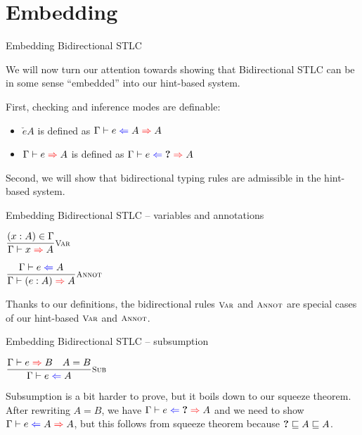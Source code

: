 \documentclass{beamer}
\begin{document}
\section{Embedding}

\begin{frame}{Embedding Bidirectional STLC}

We will now turn our attention towards showing that Bidirectional STLC can be in some sense ``embedded'' into our hint-based system.

\vspace{2em}

First, checking and inference modes are definable:

\begin{itemize}
  \item $\check{e}{A}$ is defined as $\hinting{e}{A}{A}$
  \item $\infer{e}{A}$ is defined as $\hinting{e}{\Hole}{A}$
\end{itemize}

\vspace{2em}

Second, we will show that bidirectional typing rules are admissible in the hint-based system.

\end{frame}

\begin{frame}{Embedding Bidirectional STLC -- variables and annotations}

\begin{center}
  $\infrule[Var]{\sidecond{(x : A) \in \Gamma}}{\infer{x}{A}}$

  \vspace{2em}

  $\infrule[Annot]{\check{e}{A}}{\infer{\annot{e}{A}}{A}}$
\end{center}

\vspace{2em}

Thanks to our definitions, the bidirectional rules $\textsc{\footnotesize{Var}}$ and $\textsc{\footnotesize{Annot}}$ are special cases of our hint-based $\textsc{\footnotesize{Var}}$ and $\textsc{\footnotesize{Annot}}$.

\end{frame}

\begin{frame}{Embedding Bidirectional STLC -- subsumption}

\begin{center}
  $\infrule[Sub]{\infer{e}{B} \quad \sidecond{A = B}}{\check{e}{A}}$
\end{center}

\vspace{2em}

Subsumption is a bit harder to prove, but it boils down to our squeeze theorem. After rewriting $A = B$, we have $\hinting{e}{\Hole}{A}$ and we need to show $\hinting{e}{A}{A}$, but this follows from squeeze theorem because $\textbf{?} \sqsubseteq A \sqsubseteq A$.

\end{frame}
\end{document}
